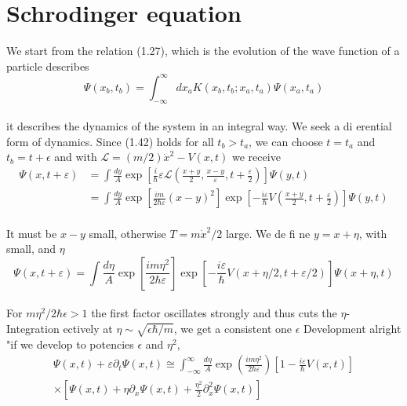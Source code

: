 \section{Schrodinger equation}
We start from the relation (1.27), which is the evolution of the wave function
of a particle describes
\\
\begin{equation}
\Psi\left(x_{b}, t_{b}\right)=\int_{-\infty}^{\infty} d x_{a} K\left(x_{b}, t_{b} ; x_{a}, t_{a}\right) \Psi\left(x_{a}, t_{a}\right)
\end{equation}\\
it describes the dynamics of the system in an integral way. We
seek a di erential form of dynamics. Since (1.42) holds for all $t_b> t_a$,
we can choose $t = t_a$ and $t_b = t + \epsilon$ and with $\mathcal{L}=(m/2)\dot{x}^2-V(x,t)$
we receive
\\
\begin{equation}
\begin{aligned} \Psi(x, t+\varepsilon) &=\int \frac{d y}{A} \exp \left[\frac{i}{\hbar} \varepsilon \mathcal{L}\left(\frac{x+y}{2}, \frac{x-y}{\varepsilon}, t+\frac{\varepsilon}{2}\right)\right] \Psi(y, t) \\ &=\int \frac{d y}{A} \exp \left[\frac{i m}{2 \hbar \varepsilon}(x-y)^{2}\right] \exp \left[-\frac{i \varepsilon}{\hbar} V\left(\frac{x+y}{2}, t+\frac{\varepsilon}{2}\right)\right] \Psi(y, t) \end{aligned}
\end{equation}\\
It must be $x-y$ small, otherwise $T = m\dot{x}^2/2$ large. We de fi ne $y = x +\eta$,
with small, and $\eta$
\\
\begin{equation}
\Psi(x, t+\varepsilon)=\int \frac{d \eta}{A} \exp \left[\frac{i m \eta^{2}}{2 \hbar \varepsilon}\right] \exp \left[-\frac{i \varepsilon}{\hbar} V(x+\eta / 2, t+\varepsilon / 2)\right] \Psi(x+\eta, t)
\end{equation}\\
For $m\eta^2/2\hbar\epsilon>1$ the first factor oscillates strongly and thus cuts the
$\eta$-Integration ectively at
$\eta \sim \sqrt{\epsilon \hbar/m}$, we get a consistent one $\epsilon$ Development alright "if we develop to potencies $\epsilon$ and $\eta^2$,
\\\begin{equation}
\begin{aligned} \Psi(x, t)+\varepsilon \partial_{t} \Psi(x, t) \cong \int_{-\infty}^{\infty} \frac{d \eta}{A} \exp \left(\frac{i m \eta^{2}}{2 \hbar \varepsilon}\right)\left[1-\frac{i \varepsilon}{\hbar} V(x, t)\right] \\ \times\left[\Psi(x, t)+\eta \partial_{x} \Psi(x, t)+\frac{\eta^{2}}{2} \partial_{x}^{2} \Psi(x, t)\right] \end{aligned}
\end{equation}
